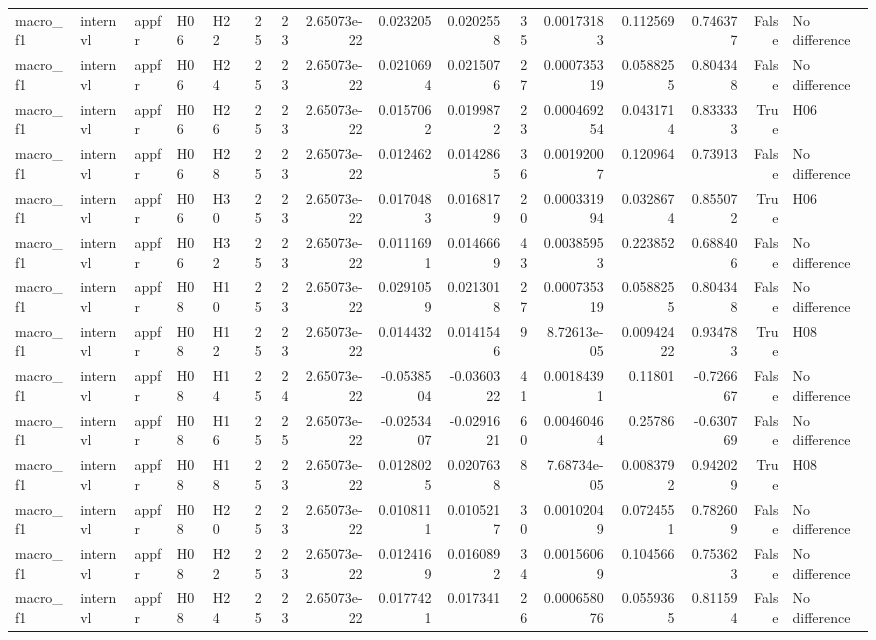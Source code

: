 \begin{longtable}{lllllrrrrrrrrrrl}
macro\_f1 & internvl & appfr & H06 & H22 & 25 & 23 & 2.65073e-22 & 0.023205 & 0.0202558 & 35 & 0.00173183 & 0.112569 & 0.746377 & False & No difference \\
macro\_f1 & internvl & appfr & H06 & H24 & 25 & 23 & 2.65073e-22 & 0.0210694 & 0.0215076 & 27 & 0.000735319 & 0.0588255 & 0.804348 & False & No difference \\
macro\_f1 & internvl & appfr & H06 & H26 & 25 & 23 & 2.65073e-22 & 0.0157062 & 0.0199872 & 23 & 0.000469254 & 0.0431714 & 0.833333 & True & H06 \\
macro\_f1 & internvl & appfr & H06 & H28 & 25 & 23 & 2.65073e-22 & 0.012462 & 0.0142865 & 36 & 0.00192007 & 0.120964 & 0.73913 & False & No difference \\
macro\_f1 & internvl & appfr & H06 & H30 & 25 & 23 & 2.65073e-22 & 0.0170483 & 0.0168179 & 20 & 0.000331994 & 0.0328674 & 0.855072 & True & H06 \\
macro\_f1 & internvl & appfr & H06 & H32 & 25 & 23 & 2.65073e-22 & 0.0111691 & 0.0146669 & 43 & 0.00385953 & 0.223852 & 0.688406 & False & No difference \\
macro\_f1 & internvl & appfr & H08 & H10 & 25 & 23 & 2.65073e-22 & 0.0291059 & 0.0213018 & 27 & 0.000735319 & 0.0588255 & 0.804348 & False & No difference \\
macro\_f1 & internvl & appfr & H08 & H12 & 25 & 23 & 2.65073e-22 & 0.014432 & 0.0141546 & 9 & 8.72613e-05 & 0.00942422 & 0.934783 & True & H08 \\
macro\_f1 & internvl & appfr & H08 & H14 & 25 & 24 & 2.65073e-22 & -0.0538504 & -0.0360322 & 41 & 0.00184391 & 0.11801 & -0.726667 & False & No difference \\
macro\_f1 & internvl & appfr & H08 & H16 & 25 & 25 & 2.65073e-22 & -0.0253407 & -0.0291621 & 60 & 0.00460464 & 0.25786 & -0.630769 & False & No difference \\
macro\_f1 & internvl & appfr & H08 & H18 & 25 & 23 & 2.65073e-22 & 0.0128025 & 0.0207638 & 8 & 7.68734e-05 & 0.0083792 & 0.942029 & True & H08 \\
macro\_f1 & internvl & appfr & H08 & H20 & 25 & 23 & 2.65073e-22 & 0.0108111 & 0.0105217 & 30 & 0.00102049 & 0.0724551 & 0.782609 & False & No difference \\
macro\_f1 & internvl & appfr & H08 & H22 & 25 & 23 & 2.65073e-22 & 0.0124169 & 0.0160892 & 34 & 0.00156069 & 0.104566 & 0.753623 & False & No difference \\
macro\_f1 & internvl & appfr & H08 & H24 & 25 & 23 & 2.65073e-22 & 0.0177421 & 0.017341 & 26 & 0.000658076 & 0.0559365 & 0.811594 & False & No difference \\

\end{longtable}
